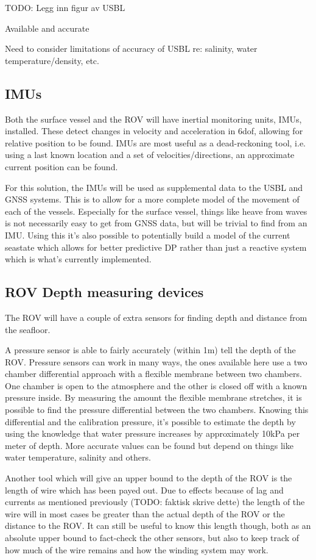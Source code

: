 \documentclass[class=article, crop=false, draft=true]{standalone}
\begin{document}
TODO: Legg inn figur av USBL

Available and accurate

Need to consider limitations of accuracy of USBL re: salinity, water temperature/density, etc.

\subsection{IMUs}
Both the surface vessel and the ROV will have inertial monitoring units, IMUs, installed. These detect changes in velocity and acceleration in 6dof, allowing for relative position to be found. IMUs are most useful as a dead-reckoning tool, i.e. using a last known location and a set of velocities/directions, an approximate current position can be found.

For this solution, the IMUs will be used as supplemental data to the USBL and GNSS systems. This is to allow for a more complete model of the movement of each of the vessels. Especially for the surface vessel, things like heave from waves is not necessarily easy to get from GNSS data, but will be trivial to find from an IMU. Using this it's also possible to potentially build a model of the current seastate which allows for better predictive DP rather than just a reactive system which is what's currently implemented.

\subsection{ROV Depth measuring devices}
The ROV will have a couple of extra sensors for finding depth and distance from the seafloor.

A pressure sensor is able to fairly accurately (within 1m) tell the depth of the ROV. Pressure sensors can work in many ways, the ones available here use a two chamber differential approach with a flexible membrane between two chambers. One chamber is open to the atmosphere and the other is closed off with a known pressure inside. By measuring the amount the flexible membrane stretches, it is possible to find the pressure differential between the two chambers. Knowing this differential and the calibration pressure, it's possible to estimate the depth by using the knowledge that water pressure increases by approximately 10kPa per meter of depth. More accurate values can be found but depend on things like water temperature, salinity and others.

Another tool which will give an upper bound to the depth of the ROV is the length of wire which has been payed out. Due to effects because of lag and currents as mentioned previously (TODO: faktisk skrive dette) the length of the wire will in most cases be greater than the actual depth of the ROV or the distance to the ROV. It can still be useful to know this length though, both as an absolute upper bound to fact-check the other sensors, but also to keep track of how much of the wire remains and how the winding system may work.
\end{document}
